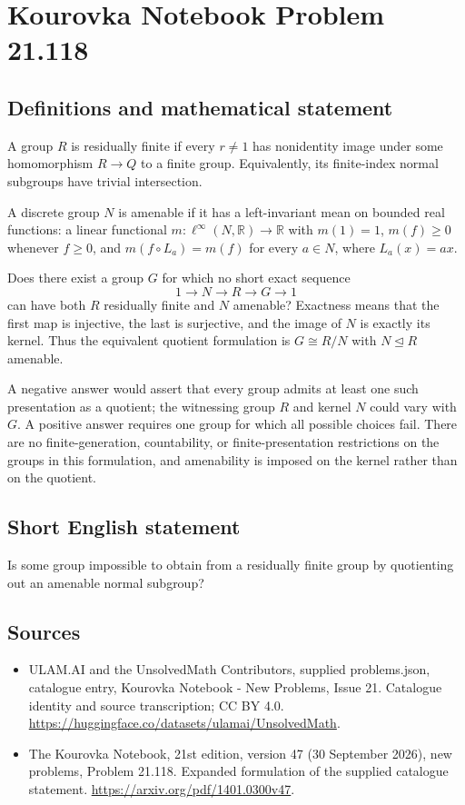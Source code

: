 \documentclass[11pt,a4paper]{article}
\begin{document}
\section*{Kourovka Notebook Problem 21.118}\label{statement}

\subsection{Definitions and mathematical statement}
A group $R$ is residually finite if every $r\ne1$ has nonidentity image under some homomorphism $R\to Q$ to a finite group. Equivalently, its finite-index normal subgroups have trivial intersection.

A discrete group $N$ is amenable if it has a left-invariant mean on bounded real functions: a linear functional $m:\ell^\infty(N,\mathbb R)\to\mathbb R$ with $m(1)=1$, $m(f)\ge0$ whenever $f\ge0$, and $m(f\circ L_a)=m(f)$ for every $a\in N$, where $L_a(x)=ax$.

Does there exist a group $G$ for which no short exact sequence
\[
 1\longrightarrow N\longrightarrow R\longrightarrow G\longrightarrow1
\]
can have both $R$ residually finite and $N$ amenable? Exactness means that the first map is injective, the last is surjective, and the image of $N$ is exactly its kernel. Thus the equivalent quotient formulation is $G\cong R/N$ with $N\trianglelefteq R$ amenable.

A negative answer would assert that every group admits at least one such presentation as a quotient; the witnessing group $R$ and kernel $N$ could vary with $G$. A positive answer requires one group for which all possible choices fail. There are no finite-generation, countability, or finite-presentation restrictions on the groups in this formulation, and amenability is imposed on the kernel rather than on the quotient.
\subsection{Short English statement}
Is some group impossible to obtain from a residually finite group by quotienting out an amenable normal subgroup?
\subsection{Sources}
\begin{itemize}
\item[S1] ULAM.AI and the UnsolvedMath Contributors, supplied problems.json, catalogue entry, Kourovka Notebook - New Problems, Issue 21. Catalogue identity and source transcription; CC BY 4.0.
\url{https://huggingface.co/datasets/ulamai/UnsolvedMath}.
\item[S2] The Kourovka Notebook, 21st edition, version 47 (30 September 2026), new problems, Problem 21.118. Expanded formulation of the supplied catalogue statement.
\url{https://arxiv.org/pdf/1401.0300v47}.
\end{itemize}
\end{document}
